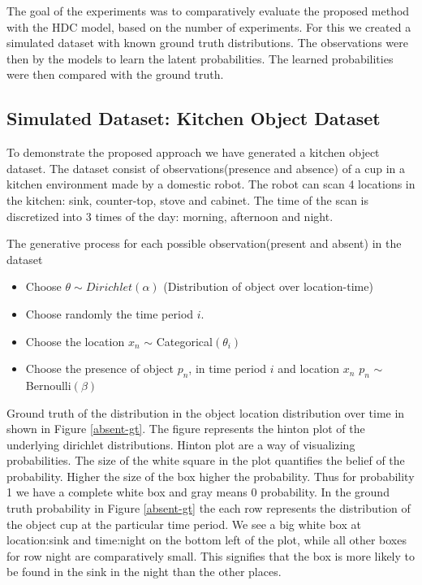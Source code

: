 The goal of the experiments was to comparatively evaluate the proposed method with the HDC model, based on the number of experiments. For this we created a simulated dataset with known ground truth distributions. The observations were then by the models to learn the latent probabilities. The learned probabilities were then compared with the ground truth. 

\subsection{Simulated Dataset: Kitchen Object Dataset}

To demonstrate the proposed approach we have generated a kitchen object dataset. The dataset consist of observations(presence and absence) of a cup in a kitchen environment made by a domestic robot. The robot can scan 4 locations in the kitchen: sink, counter-top, stove and cabinet. The time of the scan is discretized into 3 times of the day: morning, afternoon and night. 

The generative process for each possible observation(present and absent) in the dataset 
\begin{itemize}
    \item Choose $ \theta \sim Dirichlet(\alpha)$ (Distribution of object over location-time)
    \item Choose randomly the time period $i$.
	\item Choose the location $x_n$ $\sim$ Categorical$(\theta_i)$
	\item Choose the presence of object $p_n$, in time period $i$ and location $x_n$  $p_n$ $\sim$ Bernoulli$(\beta) $
\end{itemize}

Ground truth of the distribution in the object location distribution over time in shown in Figure \ref{absent-gt}. The figure represents the hinton plot of the underlying dirichlet distributions. Hinton plot are a way of visualizing probabilities. The size of the white square in the plot quantifies the belief of the probability. Higher the size of the box higher the probability. Thus for probability 1 we have a complete white box and gray means 0 probability. In the ground truth probability in Figure \ref{absent-gt} the each row represents the distribution of the object cup at the particular time period. We see a big white box at location:sink and time:night on the bottom left of the plot, while all other boxes for row night are comparatively small. This signifies that the box is more likely to be found in the sink in the night than the other places.


